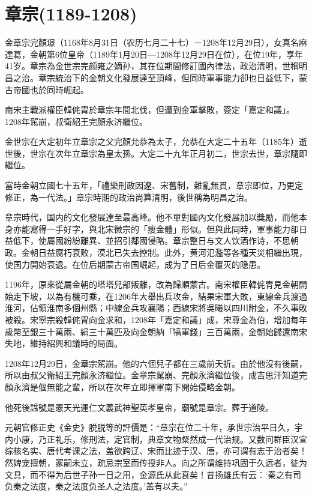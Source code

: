 
\section{章宗\tiny(1189-1208)}

金章宗完顏璟（1168年8月31日（农历七月二十七）－1208年12月29日），女真名麻達葛，金朝第6位皇帝（1189年1月20日—1208年12月29日在位），在位19年，享年41岁。章宗為金世宗完颜雍之嫡孙，其在位期間修訂國內律法，政治清明，世稱明昌之治。章宗統治下的金朝文化發展達至頂峰，但同時軍事能力卻也日益低下，蒙古帝國也於同時崛起。

南宋主戰派權臣韓侂胄於章宗年間北伐，但遭到金軍擊敗，簽定「嘉定和議」。1208年駕崩，叔衛紹王完顏永济繼位。

金世宗在大定初年立章宗之父完顏允恭為太子，允恭在大定二十五年（1185年）逝世後，世宗在次年立章宗為皇太孫。大定二十九年正月初二，世宗去世，章宗隨即繼位。

當時金朝立國七十五年，「禮樂刑政因遼、宋舊制，雜亂無貫，章宗即位，乃更定修正，為一代法。」章宗時期的政治尚算清明，後世稱為明昌之治。

章宗時代，国内的文化發展達至最高峰。他不單對國內文化發展加以獎勵，而他本身亦能寫得一手好字，與北宋徽宗的「瘦金體」形似。但與此同時，軍事能力卻日益低下，使屬國紛紛離異、並招引鄰國侵略。章宗整日与文人饮酒作诗，不思朝政。金朝日益腐朽衰败，漠北已失去控制。此外，黄河氾濫等各種天災相繼出現，使国力開始衰退。在位后期蒙古帝国崛起，成为了日后金覆灭的隐患。

1196年，原來從屬金朝的塔塔兒部叛離，改為歸順蒙古。南宋權臣韓侂冑見金朝開始走下坡，以為有機可乘，在1206年大舉出兵攻金，結果宋軍大敗，東線金兵渡過淮河，佔領淮南多個州縣；中線金兵攻襄陽；西線宋將吳曦以四川附金，不久事敗被殺。宋寧宗殺韓侂冑向金求和，1208年「嘉定和議」成，宋尊金為伯，增加每年歲幣至銀三十萬兩、絹三十萬匹及向金朝納「犒軍錢」三百萬兩，金朝始歸還南宋失地，維持紹興和議時的局面。

1208年12月29日，金章宗駕崩。他的六個兒子都在三歲前夭折。由於他沒有後嗣，所以由叔父衛紹王完顏永济繼位。金章宗駕崩、完顏永濟繼位後，成吉思汗知道完顏永濟是個無能之輩，所以在次年立即揮軍南下開始侵略金朝。

他死後諡號是憲天光運仁文義武神聖英孝皇帝，廟號是章宗。葬于道陵。

元朝官修正史《金史》脱脱等的評價是：“章宗在位二十年，承世宗治平日久，宇内小康，乃正礼乐，修刑法，定官制，典章文物粲然成一代治规。又数问群臣汉宣综核名实、唐代考课之法，盖欲跨辽、宋而比迹于汉、唐，亦可谓有志于治者矣！然婢宠擅朝，冢嗣未立，疏忌宗室而传授非人。向之所谓维持巩固于久远者，徒为文具，而不得为后世子孙一日之用，金源氏从此衰矣！昔扬雄氏有云：‘秦之有司负秦之法度，秦之法度负圣人之法度。’盖有以夫。”


